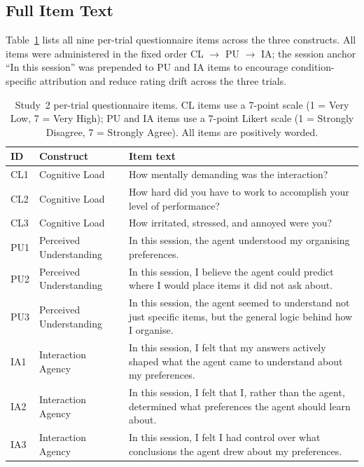 \documentclass[manuscript,review,anonymous]{acmart}
\begin{document}
\subsection*{Full Item Text}

Table~\ref{tab:questionnaire-items} lists all nine per-trial questionnaire items across the three constructs. All items were administered in the fixed order CL $\to$ PU $\to$ IA; the session anchor ``In this session'' was prepended to PU and IA items to encourage condition-specific attribution and reduce rating drift across the three trials.

\begin{table}[h]
\centering
\caption{Study~2 per-trial questionnaire items. CL items use a 7-point scale (1 = Very Low, 7 = Very High); PU and IA items use a 7-point Likert scale (1 = Strongly Disagree, 7 = Strongly Agree). All items are positively worded.}
\label{tab:questionnaire-items}
\small
\begin{tabularx}{\linewidth}{@{} l l X @{}}
\toprule
\textbf{ID} & \textbf{Construct} & \textbf{Item text} \\
\midrule
CL1 & Cognitive Load & How mentally demanding was the interaction? \\
CL2 & Cognitive Load & How hard did you have to work to accomplish your level of performance? \\
CL3 & Cognitive Load & How irritated, stressed, and annoyed were you? \\
\midrule
PU1 & Perceived Understanding & In this session, the agent understood my organising preferences. \\
PU2 & Perceived Understanding & In this session, I believe the agent could predict where I would place items it did not ask about. \\
PU3 & Perceived Understanding & In this session, the agent seemed to understand not just specific items, but the general logic behind how I organise. \\
\midrule
IA1 & Interaction Agency & In this session, I felt that my answers actively shaped what the agent came to understand about my preferences. \\
IA2 & Interaction Agency & In this session, I felt that I, rather than the agent, determined what preferences the agent should learn about. \\
IA3 & Interaction Agency & In this session, I felt I had control over what conclusions the agent drew about my preferences. \\
\bottomrule
\end{tabularx}
\end{table}
\end{document}
